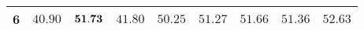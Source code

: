 \begin{table}[ht!]
\begin{tabular}{ccccccccc}
6                                       & $40.90$                              & ${\bf 51.73}$                          & $41.80$                              & $50.25$                              & $51.27$                             & $51.66$                             & $51.36$                 & $52.63$                    \\ \hline
\end{tabular}
\end{table}

